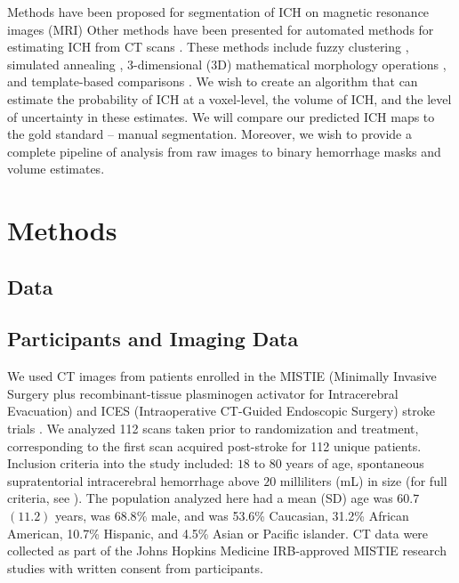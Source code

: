 \documentclass{elsarticle_nonatbib}\usepackage[]{graphicx}\usepackage[]{color}
\begin{document}
Methods have been proposed for segmentation of ICH on magnetic resonance images (MRI) 
Other methods have been presented for automated methods for estimating ICH from CT scans \citep{ gillebert_automated_2014, prakash_segmentation_2012, loncaric_hierarchical_1996, loncaric_quantitative_1999, perez_set_2007}.  These methods include fuzzy clustering \citep{prakash_segmentation_2012, loncaric_hierarchical_1996}, simulated annealing \citep{loncaric_quantitative_1999}, 3-dimensional (3D) mathematical morphology operations \citep{perez_set_2007}, and template-based comparisons \citep{gillebert_automated_2014}.  We wish to create an algorithm that can estimate the probability of ICH at a voxel-level, the volume of ICH, and the {\color{red} level of uncertainty in these estimates}.  We will compare our predicted ICH maps to the gold standard -- manual segmentation.  Moreover, we wish to provide a complete pipeline of analysis from raw images to binary hemorrhage masks and volume estimates. 


\section{Methods}

\subsection{Data} 
\subsection{ Participants and Imaging Data }
We used CT images from patients enrolled in the MISTIE (Minimally Invasive Surgery plus recombinant-tissue plasminogen activator for Intracerebral Evacuation) and ICES (Intraoperative CT-Guided Endoscopic Surgery) stroke trials \citep{morgan_preliminary_2008_mistie}. We analyzed 112 scans taken prior to randomization and treatment, corresponding to the first scan acquired post-stroke for 112 unique patients.  Inclusion criteria into the study included: $18$ to $80$ years of age, spontaneous supratentorial intracerebral hemorrhage above $20$ milliliters (mL) in size (for full criteria, see \citet{mould_minimally_2013}).  The population analyzed here had a mean (SD) age was $60.7$ $(11.2)$ years, was $68.8\%$ male, and was 53.6\% Caucasian, 31.2\% African American, 10.7\% Hispanic, and 4.5\% Asian or Pacific islander.  CT data were collected as part of the Johns Hopkins Medicine IRB-approved MISTIE research studies with written consent from participants.  
\end{document}

